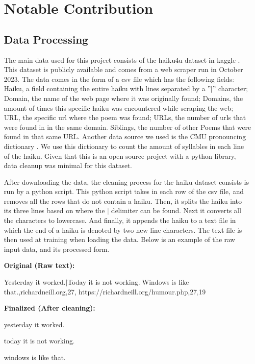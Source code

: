 \documentclass{article} %
\begin{document}
\section{Notable Contribution}

\subsection{Data Processing}
The main data used for this project consists of the haiku4u dataset in kaggle \citep{haiku4u}.
This dataset is publicly available and comes from a web scraper run in October 2023.
The data comes in the form of a csv file which has the following fields:
Haiku, a field containing the entire haiku with lines separated by a ”$|$” character;
Domain, the name of the web page where it was originally found;
Domains, the amount of times this specific haiku was encountered while scraping the web;
URL, the specific url where the poem was found;
URLs, the number of urls that were found in in the same domain.
Siblings, the number of other Poems that were found in that same URL.
Another data source we used is the CMU pronouncing dictionary \citep{cmu_pronouncing_dictionary}.
We use this dictionary to count the amount of syllables in each line of the haiku.
Given that this is an open source project with a python library, data cleanup was minimal for this dataset.


After downloading the data, the cleaning process for the haiku dataset consists is run by a python script.
This python script takes in each row of the csv file, and removes all the rows that do not contain a haiku.
Then, it splits the haiku into its three lines based on where the $|$ delimiter can be found.
Next it converts all the characters to lowercase.
And finally, it appends the haiku to a text file in which the end of a haiku is denoted by two new line characters.
The text file is then used at training when loading the data.
Below is an example of the raw input data, and its processed form.



\begin{multicols}{2}

  \textbf{Original (Raw text):} \par
  Yesterday it worked.$|$Today it is not working.$|$Windows is
  like that.,richardneill.org,27,
  https://richardneill.org/humour.php,27,19

  \columnbreak

  \raggedleft
  \textbf{Finalized (After cleaning):} \par

  \raggedleft
  yesterday it worked.

  today it is not working.

  windows is like that.
\end{multicols}
\end{document}
